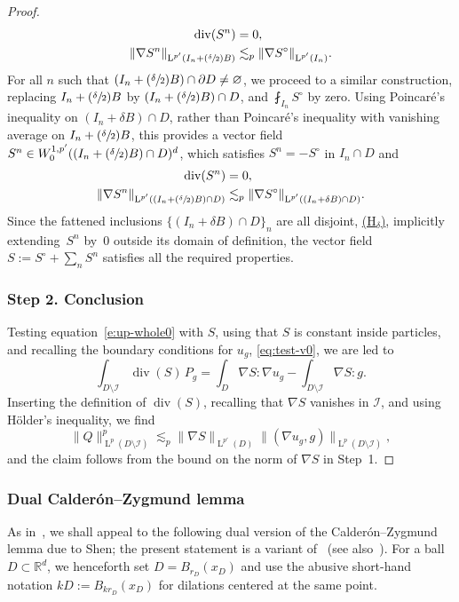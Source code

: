 \documentclass[JEP,XML,SOM,Unicode,published]{cedram}
\let\mathcal\mathscr
\newcommand{\Hd}{\hyperref[Hd]{\textup{(H$_\delta$)}}\xspace}
\newcommand{\Psfrac}[2]{(\sfrac{#1}{#2})}
\theoremstyle{plain}
\theoremstyle{definition}
\newcommand{\R}{\mathbb R}
\newcommand{\Ic}{\mathcal I}
\newcommand{\Ld}{\operatorname{L}}
\newcommand{\Div}{{\operatorname{div}}}
\newcommand{\step}[1]{\subsubsection*{Step #1}}
\begin{document}
\begin{proof}
\begin{equation}\label{eq:ext-Bogo}
\begin{aligned}
\Div( S^n) &= 0,\\
\|\nabla S^n\|_{\Ld^{p'}(I_n+\Psfrac\delta2 B)}&\lesssim_p\|\nabla S^\circ\|_{\Ld^{p'}(I_n)}.
\end{aligned}
\end{equation}
For all $n$ such that $(I_n+\Psfrac\delta2 B) \cap \partial D \ne \varnothing$,
we proceed to a similar construction, replacing $I_n+\Psfrac\delta2 B$ by $(I_n+\Psfrac\delta2 B)\cap D$, and $\fint_{I_n} S^\circ$ by zero. Using Poincaré's inequality on \mbox{$(I_n+\delta B) \cap D$}, rather than Poincaré's inequality with vanishing average on $I_n+\Psfrac\delta2 B$, this provides a vector field $S^n\in W^{1,p'}_0((I_n+\Psfrac\delta2 B)\cap D)^d$, which satisfies $S^n=-S^\circ$ in $I_n\cap D$ and
\begin{align*}
\Div( S^n) &= 0,\\
\|\nabla S^n\|_{\Ld^{p'}((I_n+\Psfrac\delta2 B)\cap D)}&\lesssim_p \|\nabla S^\circ\|_{\Ld^{p'}((I_n+\delta B)\cap D)}.
\end{align*}
Since the fattened inclusions $\{(I_n+\delta B)\cap D\}_n$ are all disjoint, \cf \Hd, implicitly extending~$S^n$ by~$0$ outside its domain of definition, the vector field $S:=S^\circ+\sum_nS^n$ satisfies all the required properties.

\step{2. Conclusion}
Testing equation~\eqref{e:up-whole0} with $S$, using that $S$ is constant inside particles, and recalling the boundary conditions for $u_g$, \cf \eqref{eq:test-v0}, we are led to
\begin{equation*}
\int_{D\setminus\Ic}\Div(S)\,P_g=\int_{D}\nabla S:\nabla u_g-\int_{D\setminus \Ic}\nabla S:g.
\end{equation*}
Inserting the definition of $\Div(S)$, recalling that $\nabla S$ vanishes in $\Ic$, and using Hölder's inequality, we find
\begin{equation*}
\|Q\|_{\Ld^p(D\setminus\Ic)}^p\lesssim_p \|\nabla S\|_{\Ld^{p'}(D)}\|(\nabla u_g,g)\|_{\Ld^{p}(D\setminus\Ic)},
\end{equation*}
and the claim follows from the bound on the norm of $\nabla S$ in Step~1.
\end{proof}

\subsubsection{Dual Calderón--Zygmund lemma}
As in~\cite{DO1}, we shall appeal to the following dual version of the Calderón--Zygmund lemma due to Shen; the present statement is a variant of~\cite[Th.\,3.2]{Shen-07} (see also~\cite[Th.\,2.4]{Shen-12}).
For a ball $D\subset\R^d$, we henceforth set $D=B_{r_D}(x_D)$ and use the abusive short-hand notation $k D:=B_{k r_D}(x_D)$ for dilations centered at the same point.
\end{document}
